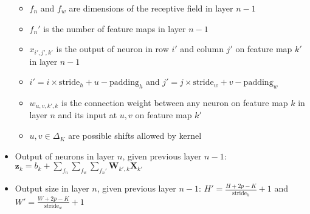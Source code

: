 \begin{itemize}
\begin{itemize}
        \item $f_n$ and $f_w$ are dimensions of the receptive field in layer $n-1$
        \item $f_n'$ is the number of feature maps in layer $n-1$
        \item $x_{i',j',k'}$ is the output of neuron in row $i'$ and column $j'$ on feature map $k'$ in layer $n-1$
        \item $i' = i \times \textrm{stride}_h + u - \textrm{padding}_h$
        and $j' = j \times \textrm{stride}_w + v - \textrm{padding}_w$
        \item $w_{u,v,k',k}$ is the connection weight between any neuron on feature map $k$ in layer $n$ and its input at $u,v$ on feature map $k'$
        \item $u,v \in \Delta_K$ are possible shifts allowed by kernel
    \end{itemize}
    \item Output of neurons in layer $n$, given previous layer $n-1$: \\
    $\boldsymbol{z}_k = b_k + \sum_{f_n} \sum_{f_w} \sum_{f_n'} \boldsymbol{W}_{k',k} \boldsymbol{X}_{k'}$
    \item Output size in layer $n$, given previous layer $n-1$: $H' = \frac{H + 2p - K}{\textrm{stride}_h} + 1$ and
    $W' = \frac{W + 2p - K}{\textrm{stride}_w} + 1$
\end{itemize}